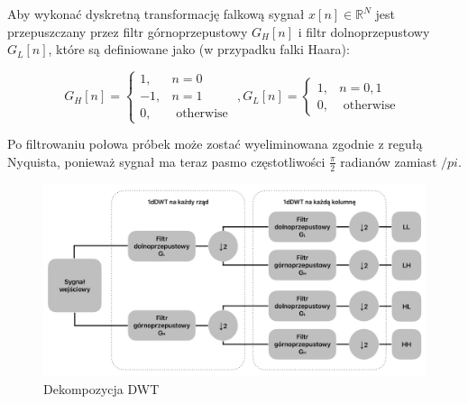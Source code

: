 Aby wykonać dyskretną transformację falkową sygnał $x[n] \in \mathbb{R}^N$ jest przepuszczany przez filtr górnoprzepustowy $G_H[n]$ i filtr dolnoprzepustowy $G_L[n]$, które są definiowane jako (w przypadku falki Haara):

\begin{equation*}
    G_H[n]=\left\{\begin{array}{ll}
    1, & n=0 \\
    -1, & n=1 \\
    0, & \text { otherwise }
    \end{array}, 
    G_L[n]= \begin{cases}1, & n=0,1 \\
    0, & \text { otherwise }\end{cases}\right.
\end{equation*}

Po filtrowaniu połowa próbek może zostać wyeliminowana zgodnie z regułą Nyquista, ponieważ sygnał ma teraz pasmo częstotliwości $\frac{\pi}{2}$ radianów zamiast $/pi$.

\begin{figure}[ht]
    \centering
    \begin{minipage}[t]{0.7\linewidth}
        \includegraphics[width=\linewidth]{Rozdziały/02.Podstawy_teoretyczne/Obrazy/DWT_dekompozycja.png}
        \caption{Dekompozycja DWT}
        \label{fig:image41}
    \end{minipage}
\end{figure}